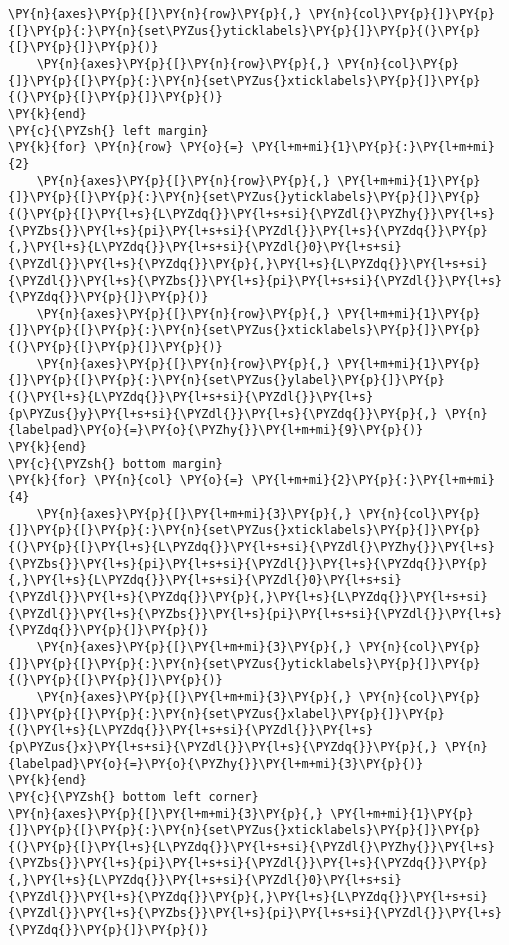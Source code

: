 \begin{Verbatim}[commandchars=\\\{\}]
    \PY{n}{axes}\PY{p}{[}\PY{n}{row}\PY{p}{,} \PY{n}{col}\PY{p}{]}\PY{p}{[}\PY{p}{:}\PY{n}{set\PYZus{}yticklabels}\PY{p}{]}\PY{p}{(}\PY{p}{[}\PY{p}{]}\PY{p}{)}
    \PY{n}{axes}\PY{p}{[}\PY{n}{row}\PY{p}{,} \PY{n}{col}\PY{p}{]}\PY{p}{[}\PY{p}{:}\PY{n}{set\PYZus{}xticklabels}\PY{p}{]}\PY{p}{(}\PY{p}{[}\PY{p}{]}\PY{p}{)}
\PY{k}{end}
\PY{c}{\PYZsh{} left margin}
\PY{k}{for} \PY{n}{row} \PY{o}{=} \PY{l+m+mi}{1}\PY{p}{:}\PY{l+m+mi}{2}
    \PY{n}{axes}\PY{p}{[}\PY{n}{row}\PY{p}{,} \PY{l+m+mi}{1}\PY{p}{]}\PY{p}{[}\PY{p}{:}\PY{n}{set\PYZus{}yticklabels}\PY{p}{]}\PY{p}{(}\PY{p}{[}\PY{l+s}{L\PYZdq{}}\PY{l+s+si}{\PYZdl{}\PYZhy{}}\PY{l+s}{\PYZbs{}}\PY{l+s}{pi}\PY{l+s+si}{\PYZdl{}}\PY{l+s}{\PYZdq{}}\PY{p}{,}\PY{l+s}{L\PYZdq{}}\PY{l+s+si}{\PYZdl{}0}\PY{l+s+si}{\PYZdl{}}\PY{l+s}{\PYZdq{}}\PY{p}{,}\PY{l+s}{L\PYZdq{}}\PY{l+s+si}{\PYZdl{}}\PY{l+s}{\PYZbs{}}\PY{l+s}{pi}\PY{l+s+si}{\PYZdl{}}\PY{l+s}{\PYZdq{}}\PY{p}{]}\PY{p}{)}
    \PY{n}{axes}\PY{p}{[}\PY{n}{row}\PY{p}{,} \PY{l+m+mi}{1}\PY{p}{]}\PY{p}{[}\PY{p}{:}\PY{n}{set\PYZus{}xticklabels}\PY{p}{]}\PY{p}{(}\PY{p}{[}\PY{p}{]}\PY{p}{)}
    \PY{n}{axes}\PY{p}{[}\PY{n}{row}\PY{p}{,} \PY{l+m+mi}{1}\PY{p}{]}\PY{p}{[}\PY{p}{:}\PY{n}{set\PYZus{}ylabel}\PY{p}{]}\PY{p}{(}\PY{l+s}{L\PYZdq{}}\PY{l+s+si}{\PYZdl{}}\PY{l+s}{p\PYZus{}y}\PY{l+s+si}{\PYZdl{}}\PY{l+s}{\PYZdq{}}\PY{p}{,} \PY{n}{labelpad}\PY{o}{=}\PY{o}{\PYZhy{}}\PY{l+m+mi}{9}\PY{p}{)}
\PY{k}{end}
\PY{c}{\PYZsh{} bottom margin}
\PY{k}{for} \PY{n}{col} \PY{o}{=} \PY{l+m+mi}{2}\PY{p}{:}\PY{l+m+mi}{4}
    \PY{n}{axes}\PY{p}{[}\PY{l+m+mi}{3}\PY{p}{,} \PY{n}{col}\PY{p}{]}\PY{p}{[}\PY{p}{:}\PY{n}{set\PYZus{}xticklabels}\PY{p}{]}\PY{p}{(}\PY{p}{[}\PY{l+s}{L\PYZdq{}}\PY{l+s+si}{\PYZdl{}\PYZhy{}}\PY{l+s}{\PYZbs{}}\PY{l+s}{pi}\PY{l+s+si}{\PYZdl{}}\PY{l+s}{\PYZdq{}}\PY{p}{,}\PY{l+s}{L\PYZdq{}}\PY{l+s+si}{\PYZdl{}0}\PY{l+s+si}{\PYZdl{}}\PY{l+s}{\PYZdq{}}\PY{p}{,}\PY{l+s}{L\PYZdq{}}\PY{l+s+si}{\PYZdl{}}\PY{l+s}{\PYZbs{}}\PY{l+s}{pi}\PY{l+s+si}{\PYZdl{}}\PY{l+s}{\PYZdq{}}\PY{p}{]}\PY{p}{)}
    \PY{n}{axes}\PY{p}{[}\PY{l+m+mi}{3}\PY{p}{,} \PY{n}{col}\PY{p}{]}\PY{p}{[}\PY{p}{:}\PY{n}{set\PYZus{}yticklabels}\PY{p}{]}\PY{p}{(}\PY{p}{[}\PY{p}{]}\PY{p}{)}
    \PY{n}{axes}\PY{p}{[}\PY{l+m+mi}{3}\PY{p}{,} \PY{n}{col}\PY{p}{]}\PY{p}{[}\PY{p}{:}\PY{n}{set\PYZus{}xlabel}\PY{p}{]}\PY{p}{(}\PY{l+s}{L\PYZdq{}}\PY{l+s+si}{\PYZdl{}}\PY{l+s}{p\PYZus{}x}\PY{l+s+si}{\PYZdl{}}\PY{l+s}{\PYZdq{}}\PY{p}{,} \PY{n}{labelpad}\PY{o}{=}\PY{o}{\PYZhy{}}\PY{l+m+mi}{3}\PY{p}{)}
\PY{k}{end}
\PY{c}{\PYZsh{} bottom left corner}
\PY{n}{axes}\PY{p}{[}\PY{l+m+mi}{3}\PY{p}{,} \PY{l+m+mi}{1}\PY{p}{]}\PY{p}{[}\PY{p}{:}\PY{n}{set\PYZus{}xticklabels}\PY{p}{]}\PY{p}{(}\PY{p}{[}\PY{l+s}{L\PYZdq{}}\PY{l+s+si}{\PYZdl{}\PYZhy{}}\PY{l+s}{\PYZbs{}}\PY{l+s}{pi}\PY{l+s+si}{\PYZdl{}}\PY{l+s}{\PYZdq{}}\PY{p}{,}\PY{l+s}{L\PYZdq{}}\PY{l+s+si}{\PYZdl{}0}\PY{l+s+si}{\PYZdl{}}\PY{l+s}{\PYZdq{}}\PY{p}{,}\PY{l+s}{L\PYZdq{}}\PY{l+s+si}{\PYZdl{}}\PY{l+s}{\PYZbs{}}\PY{l+s}{pi}\PY{l+s+si}{\PYZdl{}}\PY{l+s}{\PYZdq{}}\PY{p}{]}\PY{p}{)}

\end{Verbatim}
